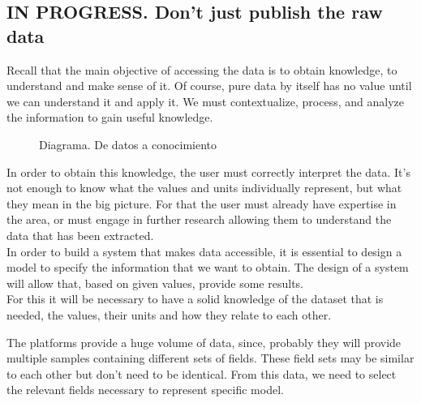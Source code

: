\subsection{IN PROGRESS. Don't just publish the raw data}

Recall that the main objective of accessing the data is to obtain knowledge, to understand and make sense of it.
Of course, pure data by itself has no value until we can understand it and apply it.
We must contextualize, process, and analyze the information to gain useful knowledge. \\ 
    
\begin{figure}[ht]
    \centering 
    \caption{Diagrama. De datos a conocimiento}
\end{figure}
 
In order to obtain this knowledge, the user must correctly interpret the data.
It's not enough to know what the values and units individually represent, but what they mean in the big picture.
For that the user must already have expertise in the area, or must engage in further research allowing them to understand the data that has been extracted.\\
    
In order to build a system that makes data accessible, it is essential to design a model to specify the information that we want to obtain.
The design of a system will allow that, based on given values, provide some results.\\

For this it will be necessary to have a solid knowledge of the dataset that is needed, the values, their units and how they relate to each other.

The platforms provide a huge volume of data, since, probably they will provide multiple samples containing different sets of fields. 
These field sets may be similar to each other but don't need to be identical.
From this data, we need to select the relevant fields necessary to represent specific model.\\

